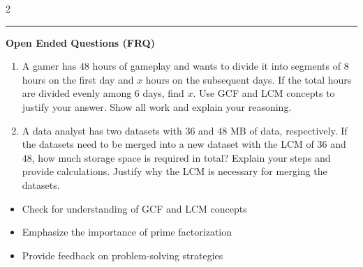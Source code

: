 \documentclass[10pt]{article}
\begin{document}
\begin{multicols}{2}
\begin{enumerate}[label=\textbf{Q\arabic*.}, leftmargin=*, itemsep=6pt, parsep=0pt]
\end{enumerate}
\end{multicols}

\vspace{-0.2cm}
\hrule
\vspace{0.2cm}
\textbf{\small Open Ended Questions (FRQ)}
\begin{enumerate}[label=\textbf{Q\arabic*.}, start=9, itemsep=5pt, topsep=0pt]

  \item \small A gamer has $48$ hours of gameplay and wants to divide it into segments of $8$ hours on the first day and $x$ hours on the subsequent days. If the total hours are divided evenly among $6$ days, find $x$. Use GCF and LCM concepts to justify your answer. Show all work and explain your reasoning. \vspace{2cm}

  \item \small A data analyst has two datasets with $36$ and $48$ MB of data, respectively. If the datasets need to be merged into a new dataset with the LCM of $36$ and $48$, how much storage space is required in total? Explain your steps and provide calculations. Justify why the LCM is necessary for merging the datasets. \vspace{2cm}

\end{enumerate}

\vfill

\begin{tcolorbox}[colback=blue!5, colframe=mainblue!50, title=\small \textbf{Chef's Tips}, fonttitle=\bfseries, bottom=1mm]
\begin{itemize}[noitemsep, topsep=2pt, leftmargin=0.5cm]
  \item \scriptsize Check for understanding of GCF and LCM concepts\item \scriptsize Emphasize the importance of prime factorization\item \scriptsize Provide feedback on problem-solving strategies
\end{itemize}
\end{tcolorbox}
\end{document}
